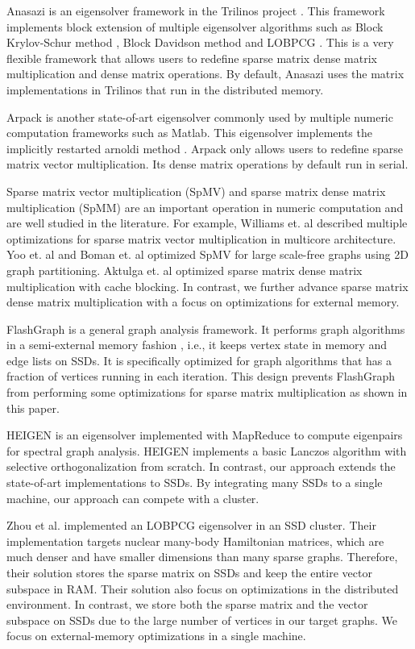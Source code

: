 Anasazi \cite{anasazi} is an eigensolver framework in the Trilinos project
\cite{trilinos}. This framework implements block extension of multiple
eigensolver algorithms
such as Block Krylov-Schur method \cite{krylovschur}, Block Davidson method
\cite{Arbenz05} and LOBPCG \cite{Arbenz05}. This is a very flexible framework
that allows users to redefine sparse matrix dense matrix multiplication and
dense matrix operations. By default, Anasazi uses the matrix implementations
in Trilinos that run in the distributed memory.

Arpack \cite{arpack} is another state-of-art eigensolver commonly used by
multiple numeric computation frameworks such as Matlab. This eigensolver
implements the implicitly restarted arnoldi method \cite{IRAM}. Arpack
only allows users to redefine sparse matrix vector multiplication.
Its dense matrix operations by default run in serial.

Sparse matrix vector multiplication (SpMV) and sparse matrix dense matrix
multiplication (SpMM) are an important operation in numeric computation and
are well studied in the literature. For example, Williams et. al
\cite{Williams07} described multiple optimizations for sparse matrix
vector multiplication in multicore architecture. Yoo et. al \cite{Yoo11}
and Boman et. al \cite{Boman2013} optimized SpMV for large scale-free graphs
using 2D graph partitioning. Aktulga et. al \cite{Aktulga14} optimized sparse
matrix dense matrix multiplication with cache blocking. In contrast, we
further advance sparse matrix dense matrix multiplication with a focus on
optimizations for external memory.

FlashGraph \cite{flashgraph} is a general graph analysis framework. It performs
graph algorithms in a semi-external memory fashion \cite{sem}, i.e., it keeps
vertex state in memory and edge lists on SSDs. It is specifically optimized for
graph algorithms that has a fraction of vertices running in each iteration.
This design prevents FlashGraph from performing some optimizations for sparse
matrix multiplication as shown in this paper.

HEIGEN \cite{Kang11} is an eigensolver implemented with MapReduce \cite{mapreduce}
to compute eigenpairs for spectral graph analysis. HEIGEN implements a basic
Lanczos algorithm
\cite{Lanczos} with selective orthogonalization from scratch. In contrast, our
approach extends the state-of-art implementations to SSDs. By integrating many
SSDs to a single machine, our approach can compete with a cluster.

Zhou et al. \cite{Zhou12} implemented an LOBPCG \cite{Arbenz05} eigensolver in
an SSD cluster. Their implementation targets nuclear many-body Hamiltonian
matrices, which are much denser and have smaller dimensions than many sparse
graphs. Therefore, their solution stores the sparse matrix on SSDs and keep
the entire vector subspace in RAM. Their solution also focus on optimizations
in the distributed environment. In contrast, we store both the sparse matrix
and the vector subspace on SSDs due to the large number of vertices in
our target graphs. We focus on external-memory optimizations in a single machine.
